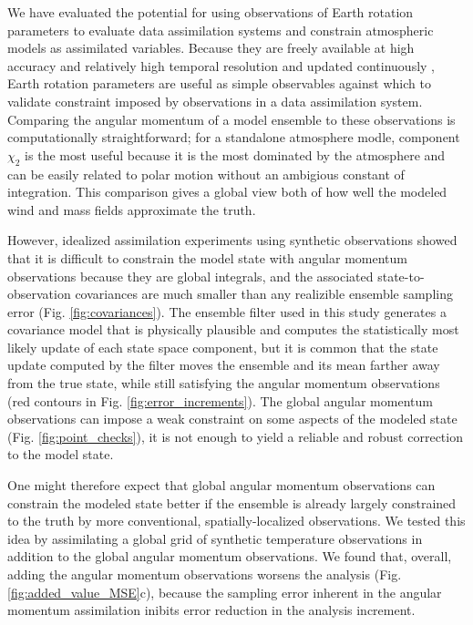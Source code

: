 We have evaluated the potential for using observations of Earth rotation parameters to evaluate data assimilation systems and constrain atmospheric models as assimilated variables.  
%
Because they are freely available at high accuracy and relatively high temporal resolution and updated continuously \citep{iers}, 
Earth rotation parameters are useful as simple observables against which to validate constraint imposed by observations in a data assimilation system.  
Comparing the angular momentum of a model ensemble to these observations is computationally straightforward;
for a standalone atmosphere modle, component $\chi_2$ is the most useful because it is the most dominated by the atmosphere and can be easily related to polar motion without an ambigious constant of integration. 
This comparison gives a global view both of how well the modeled wind and mass fields approximate the truth.

However, idealized assimilation experiments using synthetic observations showed that it is difficult to constrain the model state with angular momentum observations because they are global integrals, 
and the associated state-to-observation covariances are much smaller than any realizible ensemble sampling error (Fig. \ref{fig:covariances}). 
The ensemble filter used in this study generates a covariance model that is physically plausible and computes the statistically most likely update of each state space component, but it is common that 
the state update computed by the filter moves the ensemble and its mean farther away from the true state, while still satisfying the angular momentum observations (red contours in Fig. \ref{fig:error_increments}). 
The global angular momentum observations can impose a weak constraint on some aspects of the modeled state (Fig. \ref{fig:point_checks}), it is not enough to yield a reliable and robust correction to the model state. 

One might therefore expect that global angular momentum observations can constrain the modeled state better if the ensemble is already largely constrained to the truth by more conventional, spatially-localized observations. 
We tested this idea by assimilating a global grid of synthetic temperature observations in addition to the global angular momentum observations. 
We found that, overall, adding the angular momentum observations worsens the analysis (Fig. \ref{fig:added_value_MSE}c), 
because the sampling error inherent in the angular momentum assimilation inibits error reduction in the analysis increment. 

